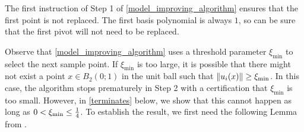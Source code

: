 
%
%
%
%

The first instruction of Step 1 of \cref{model_improving_algorithm} ensures that the first point is not replaced.
The first basis polynomial is always $1$, so can be sure that the first pivot will not need to be replaced.

Observe that \cref{model_improving_algorithm} uses a threshold parameter $\xi_{\min}$ to select the next sample point.
If $\xi_{\min}$ is too large, it is possible that there might not exist a point $x \in B_2(0;1)$ 
in the unit ball such that $\|u_i(x)\| \ge \xi_{\text{min}}$.
In this case, the algorithm stops prematurely in Step 2 with a certification that $\xi_{\min}$ is too small.
However,  in \cref{terminates} below, we show that this cannot happen as long as $0 < \xi_{\text{min}} \le \frac 1 4$.
To establish the result, we first need the following Lemma from \cite{introduction_book}.



